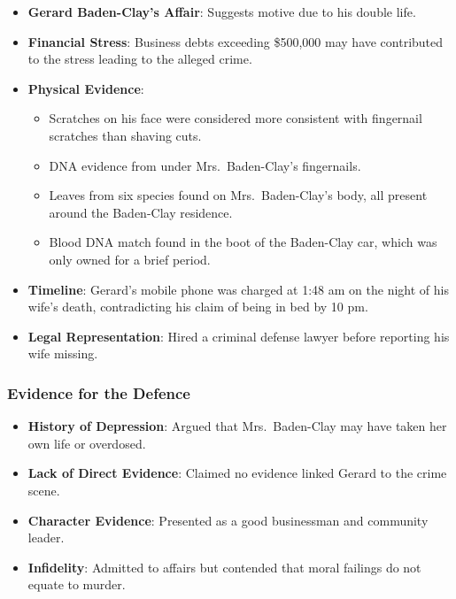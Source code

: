 \begin{itemize}
\tightlist
\item
  \textbf{Gerard Baden-Clay's Affair}: Suggests motive due to his double
  life.
\item
  \textbf{Financial Stress}: Business debts exceeding \$500,000 may have
  contributed to the stress leading to the alleged crime.
\item
  \textbf{Physical Evidence}:

  \begin{itemize}
  \tightlist
  \item
    Scratches on his face were considered more consistent with
    fingernail scratches than shaving cuts.
  \item
    DNA evidence from under Mrs.~Baden-Clay's fingernails.
  \item
    Leaves from six species found on Mrs.~Baden-Clay's body, all present
    around the Baden-Clay residence.
  \item
    Blood DNA match found in the boot of the Baden-Clay car, which was
    only owned for a brief period.
  \end{itemize}
\item
  \textbf{Timeline}: Gerard's mobile phone was charged at 1:48 am on the
  night of his wife's death, contradicting his claim of being in bed by
  10 pm.
\item
  \textbf{Legal Representation}: Hired a criminal defense lawyer before
  reporting his wife missing.
\end{itemize}

\subsubsection{Evidence for the Defence}\label{evidence-for-the-defence}

\begin{itemize}
\tightlist
\item
  \textbf{History of Depression}: Argued that Mrs.~Baden-Clay may have
  taken her own life or overdosed.
\item
  \textbf{Lack of Direct Evidence}: Claimed no evidence linked Gerard to
  the crime scene.
\item
  \textbf{Character Evidence}: Presented as a good businessman and
  community leader.
\item
  \textbf{Infidelity}: Admitted to affairs but contended that moral
  failings do not equate to murder.
\end{itemize}

